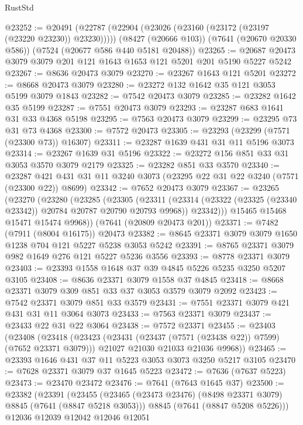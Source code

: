 \begin{lexlean}{RustStd}
\begin{coremodule}
@23252 := @20491
    (@22787 (@22904 (@23026 (@23160 (@23172 (@23197 (@23220 @23230)) @23230)))))
    (@8427 (@20666 @103))
    (@7641 (@20670 @20330 @586))
    (@7524 (@20677 @586 @440 @5181 @20488))
@23265 := @20687 @20473 @3079 @3079 @201 @121 @1643 @1653 @121 @5201 @201 @5190 @5227 @5242
@23267 := @8636 @20473 @3079
@23270 := @23267 @1643 @121 @5201
@23272 := @8668 @20473 @3079
@23280 := @23272 @132 @1642 @35 @121 @3053 @5199 @3079 @1843
@23282 := @7542 @20473 @3079
@23285 := @23282 @1642 @35 @5199
@23287 := @7551 @20473 @3079
@23293 := @23287 @683 @1641 @31 @33 @4368 @5198
@23295 := @7563 @20473 @3079
@23299 := @23295 @73 @31 @73 @4368
@23300 := @7572 @20473
@23305 := @23293 (@23299 (@7571 (@23300 @73)) @16307)
@23311 := @23287 @1639 @431 @31 @11 @5196 @3073
@23314 := @23267 @1639 @31 @5196
@23322 := @23272 @156 @851 @33 @31 @3053 @3570 @3079 @2179
@23325 := @23282 @851 @33 @3570
@23340 := @23287 @421 @431 @31 @11 @3240 @3073 (@23295 @22 @31 @22 @3240 (@7571 (@23300 @22)) @8699)
@23342 := @7652 @20473 @3079
@23367 := @23265
    (@23270
      (@23280
        (@23285
          (@23305
            (@23311
              (@23314 (@23322 (@23325 (@23340 @23342)) @20784 @20787 @20790 @20793 @9968))
              @23342)))
        @15465
        @15468
        @15471
        @15474
        @9968))
    (@7641 (@20809 @20473 @201))
@23371 := @7482 (@7911 (@8004 @16175)) @20473
@23382 := @8645 @23371 @3079 @3079 @1650 @1238 @704 @121 @5227 @5238 @3053 @5242
@23391 := @8765 @23371 @3079 @982 @1649 @276 @121 @5227 @5236 @3556
@23393 := @8778 @23371 @3079
@23403 := @23393 @1558 @1648 @37 @39 @4845 @5226 @5235 @3250 @5207 @3105
@23408 := @8636 @23371 @3079 @1558 @37 @4845
@23418 := @8668 @23371 @3079 @309 @851 @33 @37 @3053 @3579 @3079 @2092
@23423 := @7542 @23371 @3079 @851 @33 @3579
@23431 := @7551 @23371 @3079 @421 @431 @31 @11 @3064 @3073
@23433 := @7563 @23371 @3079
@23437 := @23433 @22 @31 @22 @3064
@23438 := @7572 @23371
@23455 := @23403
    (@23408
      (@23418
        (@23423 (@23431 (@23437 (@7571 (@23438 @22)) @7599) (@7652 @23371 @3079)))
        @21027
        @21030
        @21033
        @21036
        @9968))
@23465 := @23393 @1646 @431 @37 @11 @5223 @3053 @3073 @3250 @5217 @3105
@23470 := @7628 @23371 @3079 @37 @1645 @5223
@23472 := @7636 (@7637 @5223)
@23473 := @23470 @23472
@23476 := @7641 (@7643 @1645 @37)
@23500 := @23382
    (@23391
      (@23455
        (@23465 (@23473 @23476) (@8498 @23371 @3079) @8845 (@7641 (@8847 @5218 @3053)))
        @8845
        (@7641 (@8847 @5208 @5226)))
      @12036
      @12039
      @12042
      @12046
      @12051

\end{coremodule}
\end{lexlean}
